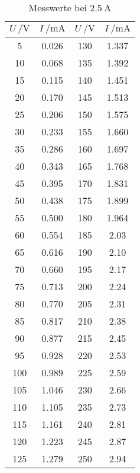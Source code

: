 \begin{table}[H]
  \centering
  \caption{Messwerte bei $ \SI{2.5}{\ampere}$}
  \label{tab:tabe2}
    \begin{tabular}{S S |S S}
    \toprule
    $ U \: / \si{\volt} $ & $ I \: / \si{\milli\ampere} $ & $ U \: / \si{\volt} $ & $ I \: / \si{\milli\ampere} $  \\
     & 0.026 & 130 & 1.337 \\
    10 & 0.068 & 135 & 1.392 \\
    15 & 0.115 & 140 & 1.451 \\
    20 & 0.170 & 145 & 1.513 \\
    25 & 0.206 & 150 & 1.575 \\
    30 & 0.233 & 155 & 1.660 \\
    35 & 0.286 & 160 & 1.697 \\
    40 & 0.343 & 165 & 1.768 \\
    45 & 0.395 & 170 & 1.831 \\
    50 & 0.438 & 175 & 1.899 \\
    55 & 0.500 & 180 & 1.964 \\
    60 & 0.554 & 185 & 2.03 \\
    65 & 0.616 & 190 & 2.10 \\
    70 & 0.660 & 195 & 2.17 \\
    75 & 0.713 & 200 & 2.24 \\
    80 & 0.770 & 205 & 2.31 \\
    85 & 0.817 & 210 & 2.38 \\
    90 & 0.877 & 215 & 2.45 \\
    95 & 0.928 & 220 & 2.53 \\
    100 & 0.989 & 225 & 2.59 \\
    105 & 1.046 & 230 & 2.66 \\
    110 & 1.105 & 235 & 2.73 \\
    115 & 1.161 & 240 & 2.81 \\
    120 & 1.223 & 245 & 2.87 \\
    125 & 1.279 & 250 & 2.94 \\



          \bottomrule
        \end{tabular}
    \end{table}
